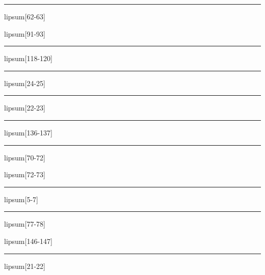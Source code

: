 \documentclass[11pt,a4paper]{article}
\begin{document}
\begin{simplewrap}
  \textcolor{olive!21}{\rule{3.3cm}{2.8cm}}
\end{simplewrap}
lipsum[62-63]

lipsum[91-93]

\begin{simplewrap}
  \textcolor{teal!60}{\rule{4.2cm}{5.0cm}}
\end{simplewrap}
lipsum[118-120]

\begin{simplewrap}
  \textcolor{magenta!29}{\rule{5.1cm}{8.8cm}}
\end{simplewrap}
lipsum[24-25]

\begin{simplewrap}
  \textcolor{pink!45}{\rule{4.4cm}{7.1cm}}
\end{simplewrap}
lipsum[22-23]

\begin{simplewrap}
  \textcolor{olive!51}{\rule{5.4cm}{6.5cm}}
\end{simplewrap}
lipsum[136-137]

\begin{simplewrap}
  \textcolor{magenta!23}{\rule{5.7cm}{7.5cm}}
\end{simplewrap}
lipsum[70-72]

lipsum[72-73]

\begin{simplewrap}
  \textcolor{magenta!46}{\rule{5.0cm}{3.4cm}}
\end{simplewrap}
lipsum[5-7]

\begin{simplewrap}
  \textcolor{purple!58}{\rule{5.5cm}{8.6cm}}
\end{simplewrap}
lipsum[77-78]

lipsum[146-147]

\begin{simplewrap}
  \textcolor{pink!53}{\rule{5.7cm}{4.7cm}}
\end{simplewrap}
lipsum[21-22]
\end{document}
